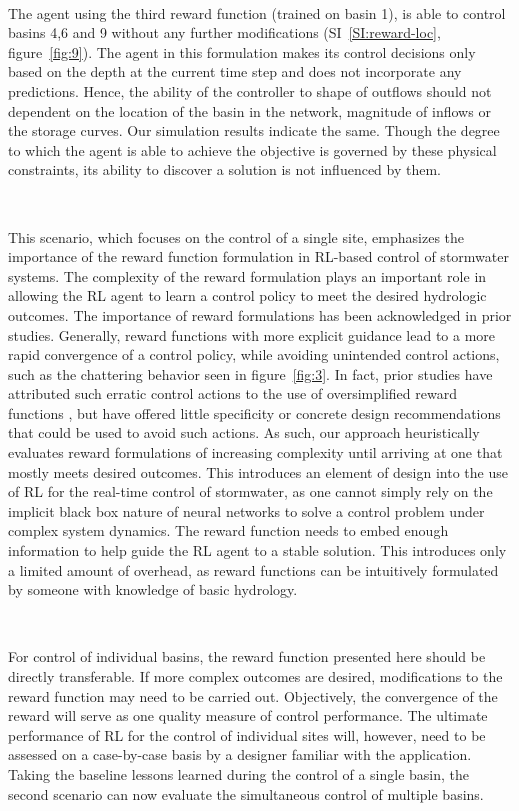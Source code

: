 \

The agent using the third reward function (trained on basin 1), is able to control basins 4,6 and 9 without any further modifications (SI~\ref{SI:reward-loc}, figure~\ref{fig:9}).
The agent in this formulation makes its control decisions only based on the depth at the current time step and does not incorporate any predictions.
Hence, the ability of the controller to shape of outflows should not dependent on the location of the basin in the network, magnitude of inflows or the storage curves.
Our simulation results indicate the same.
Though the degree to which the agent is able to achieve the objective is governed by these physical constraints, its ability to discover a solution is not influenced by them.

\

This scenario, which focuses on the control of a single site, emphasizes the importance of the reward function formulation in RL-based control of stormwater systems.
The complexity of the reward formulation plays an important role in allowing the RL agent to learn a control policy to meet the desired hydrologic outcomes.
The importance of reward formulations has been acknowledged in prior studies\cite{Sutton98, ng1999policy}.
Generally, reward functions with more explicit guidance lead to a more rapid convergence of a control policy, while avoiding unintended control actions, such as the chattering behavior seen in figure~\ref{fig:3}.
In fact, prior studies have attributed such erratic control actions to the use of oversimplified reward functions \cite{ng1999policy}, but have offered little specificity or concrete design recommendations that could be used to avoid such actions.
As such, our approach heuristically evaluates reward formulations of increasing complexity until arriving at one that mostly meets desired outcomes.
This introduces an element of design into the use of RL for the real-time control of stormwater, as one cannot simply rely on the implicit black box nature of neural networks to solve a control problem under complex system dynamics.
The reward function needs to embed enough information to help guide the RL agent to a stable solution.
This introduces only a limited amount of overhead, as reward functions can be intuitively formulated by someone with knowledge of basic hydrology.

\

For control of individual basins, the reward function presented here should be directly transferable.
If more complex outcomes are desired, modifications to the reward function may need to be carried out.
Objectively, the convergence of the reward will serve as one quality measure of control performance.
The ultimate performance of RL for the control of individual sites will, however, need to be assessed on a case-by-case basis by a designer familiar with the application.
Taking the baseline lessons learned during the control of a single basin, the second scenario can now evaluate the simultaneous control of multiple basins.

